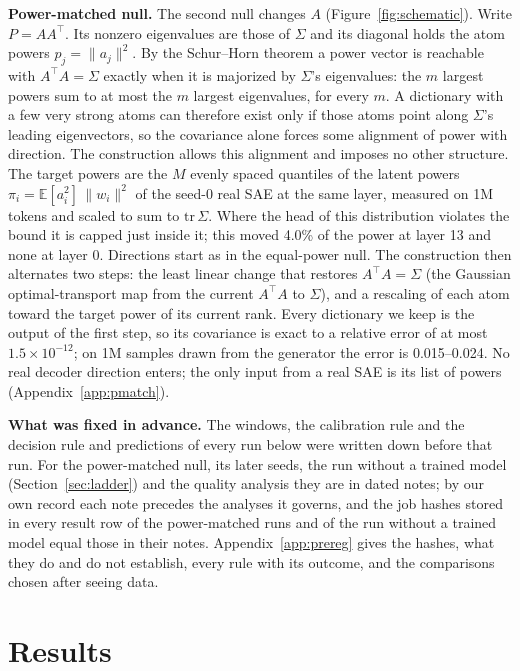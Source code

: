 \documentclass{article}
\newcommand{\Sig}{\Sigma}
\begin{document}
\textbf{Power-matched null.} The second null changes $A$ (Figure~\ref{fig:schematic}). Write $P = AA^\top$. Its nonzero eigenvalues are those of $\Sig$ and its diagonal holds the atom powers $p_j = \|a_j\|^2$. By the Schur--Horn theorem a power vector is reachable with $A^\top A = \Sig$ exactly when it is majorized by $\Sig$'s eigenvalues: the $m$ largest powers sum to at most the $m$ largest eigenvalues, for every $m$. A dictionary with a few very strong atoms can therefore exist only if those atoms point along $\Sig$'s leading eigenvectors, so the covariance alone forces some alignment of power with direction. The construction allows this alignment and imposes no other structure. The target powers are the $M$ evenly spaced quantiles of the latent powers $\pi_i = \mathbb{E}[a_i^2]\,\|w_i\|^2$ of the seed-0 real SAE at the same layer, measured on 1M tokens and scaled to sum to $\mathrm{tr}\,\Sig$. Where the head of this distribution violates the bound it is capped just inside it; this moved 4.0\% of the power at layer 13 and none at layer 0. Directions start as in the equal-power null. The construction then alternates two steps: the least linear change that restores $A^\top A=\Sig$ (the Gaussian optimal-transport map from the current $A^\top A$ to $\Sig$), and a rescaling of each atom toward the target power of its current rank. Every dictionary we keep is the output of the first step, so its covariance is exact to a relative error of at most $1.5\times 10^{-12}$; on 1M samples drawn from the generator the error is 0.015--0.024. No real decoder direction enters; the only input from a real SAE is its list of powers (Appendix~\ref{app:pmatch}).

\textbf{What was fixed in advance.} The windows, the calibration rule and the decision rule and predictions of every run below were written down before that run. For the power-matched null, its later seeds, the run without a trained model (Section~\ref{sec:ladder}) and the quality analysis they are in dated notes; by our own record each note precedes the analyses it governs, and the job hashes stored in every result row of the power-matched runs and of the run without a trained model equal those in their notes. Appendix~\ref{app:prereg} gives the hashes, what they do and do not establish, every rule with its outcome, and the comparisons chosen after seeing data.

\section{Results}
\end{document}
